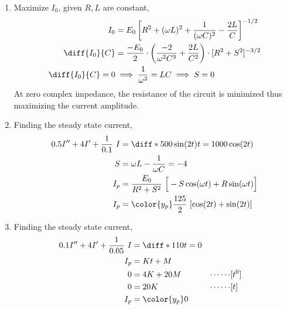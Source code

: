 \begin{enumerate}
    \item Maximize $ I_{0} $, given $ R, L $ are constant,
          \begin{align}
              I_{0}                & = E_{0} \left[ R^{2} + (\omega L)^{2} + \frac{1}{(\omega C)^{2}}
              - \frac{2L}{C} \right]^{-1/2}                                                           \\
              \diff {I_{0}}{C}     & = \frac{-E_{0}}{2} \cdot \left( \frac{-2}{\omega^{2}C^{3}}
              + \frac{2L}{C^{2}} \right) \cdot [R^{2} + S^{2}]^{-3/2}                                 \\
              \diff {I_{0}}{C} = 0 & \implies \frac{1}{\omega^{2}} = LC \implies S = 0
          \end{align}
          At zero complex impedance, the resistance of the circuit is minimized thus maximizing
          the current amplitude.

    \item Finding the steady state current,
          \begin{align}
              0.5I'' + 4I' + \frac{1}{0.1}\ I & = \diff* {500 \sin(2t)}{t} = 1000\cos(2t)                                   \\
              S                               & = \omega L - \frac{1}{\omega C} = -4                                        \\
              I_{p}                           & = \frac{E_{0}}{R^{2} + S^{2}}\ \Big[-S\cos(\omega t) + R\sin(\omega t)\Big] \\
              I_{p}                           & = {\color{y_p} \frac{125}{2}\ [\cos(2t) + \sin(2t)]}                        \\
          \end{align}

    \item Finding the steady state current,
          \begin{align}
              0.1I'' + 4I' + \frac{1}{0.05}\ I & = \diff* {110}{t} = 0                          \\
              I_{p}                            & = Kt + M                                       \\
              0                                & = 4K + 20M            & \cdots\cdots & [t^{0}] \\
              0                                & = 20K                 & \cdots\cdots & [t]     \\
              I_{p}                            & = {\color{y_p} 0}                              \\
          \end{align}


\end{enumerate}
